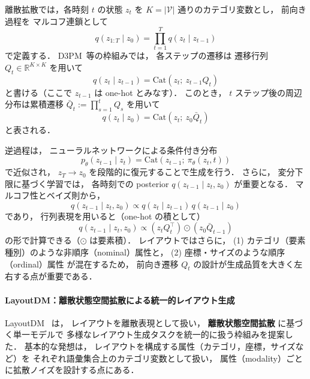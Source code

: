 \documentclass[a4j,12pt,dvipdfmx]{jsreport}
\begin{document}
離散拡散では，各時刻 $t$ の状態 $z_t$ を
$K = |\mathcal{V}|$ 通りのカテゴリ変数とし，
前向き過程を
マルコフ連鎖として
\begin{equation}
   q(z_{1:T}\mid z_0)
   =
   \prod_{t=1}^{T} q(z_t\mid z_{t-1})
\end{equation}
で定義する．
D3PM~\cite{hoogeboom2021d3pm}等の枠組みでは，
各ステップの遷移は
遷移行列 $Q_t\in\mathbb{R}^{K\times K}$ を用いて
\begin{equation}
   q(z_t \mid z_{t-1})
   =
   \mathrm{Cat}\!\left(z_t;\ z_{t-1}Q_t\right)
\end{equation}
と書ける（ここで $z_{t-1}$ は one-hot とみなす）．
このとき，
$t$ ステップ後の周辺分布は累積遷移
$\bar{Q}_t:=\prod_{s=1}^{t}Q_s$ を用いて
\begin{equation}
   q(z_t\mid z_0)
   =
   \mathrm{Cat}\!\left(z_t;\ z_0\bar{Q}_t\right)
\end{equation}
と表される．

逆過程は，
ニューラルネットワークによる条件付き分布
\begin{equation}
   p_\theta(z_{t-1}\mid z_t)
   =
   \mathrm{Cat}\!\left(z_{t-1};\ \pi_\theta(z_t,t)\right)
\end{equation}
で近似され，
$z_T\to z_0$ を段階的に復元することで生成を行う．
さらに，
変分下限に基づく学習では，
各時刻での posterior
$q(z_{t-1}\mid z_t, z_0)$ が重要となる．
マルコフ性とベイズ則から，
\begin{equation}
   q(z_{t-1}\mid z_t, z_0)
   \propto
   q(z_t\mid z_{t-1})\,q(z_{t-1}\mid z_0)
\end{equation}
であり，
行列表現を用いると（one-hot の積として）
\begin{equation}
   q(z_{t-1}\mid z_t, z_0)
   \propto
   \left(z_t Q_t^\top\right)\odot\left(z_0\bar{Q}_{t-1}\right)
\end{equation}
の形で計算できる（$\odot$ は要素積）．
レイアウトではさらに，
(1) カテゴリ（要素種別）のような非順序（nominal）属性と，
(2) 座標・サイズのような順序（ordinal）属性
が混在するため，
前向き遷移 $Q_t$ の設計が生成品質を大きく左右する点が重要である．


\paragraph{LayoutDM：離散状態空間拡散による統一的レイアウト生成}
LayoutDM~\cite{inoue_layoutdm_2023} は，
レイアウトを離散表現として扱い，
\textbf{離散状態空間拡散} に基づく単一モデルで
多様なレイアウト生成タスクを統一的に扱う枠組みを提案した．
基本的な発想は，
レイアウトを構成する属性（カテゴリ，座標，サイズなど）を
それぞれ語彙集合上のカテゴリ変数として扱い，
属性（modality）ごとに拡散ノイズを設計する点にある．
\end{document}
